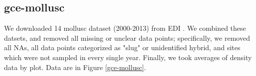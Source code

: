 \documentclass[11pt, oneside]{article}
\begin{document}
\subsection {gce-mollusc}
We downloaded 14 mollusc dataset (2000-2013) from EDI \citep{project_mollusc_2014, project_mollusc_2014-1, project_mollusc_2014-2, project_mollusc_2014-3, project_mollusc_2014-4, project_mollusc_2014-5, project_mollusc_2014-6, project_mollusc_2014-7, project_mollusc_2014-8, project_mollusc_2014-9, project_mollusc_2014-10, project_mollusc_2014-11, project_mollusc_2014-12, project_mollusc_2014-13}. We combined these datsets, and removed all missing or unclear data points; specifically, we removed all NAs, all data points categorized as "slug" or unidentified hybrid, and sites which were not sampled in every single year. Finally, we took averages of density data by plot. %
Data are in Figure \ref{gce-mollusc}.
\end{document}
